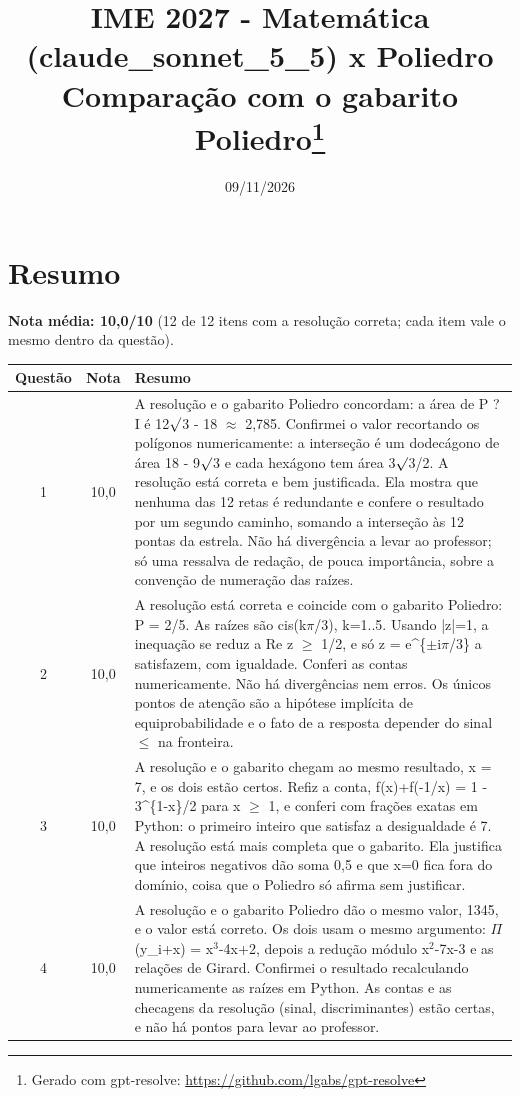 \documentclass{article}%
\title{IME 2027 {-} Matemática (claude\_sonnet\_5\_5) x Poliedro\\[4pt]\large Comparação com o gabarito Poliedro\thanks{Gerado com gpt-resolve: \url{https://github.com/lgabs/gpt-resolve}}}%
\date{09/11/2026}%
\begin{document}
%
\normalsize%
\maketitle%
\section*{Resumo}\textbf{Nota média: 10,0/10} (12 de 12 itens com a resolução correta; cada item vale o mesmo dentro da questão).\par\medskip%
\begin{longtable}{@{}c c p{}@{}}\toprule Questão & Nota & Resumo \\ \midrule
1 & 10,0 & A resolução e o gabarito Poliedro concordam: a área de P ? I é 12$\surd$3 - 18 $\approx$ 2,785. Confirmei o valor recortando os polígonos numericamente: a interseção é um dodecágono de área 18 - 9$\surd$3 e cada hexágono tem área 3$\surd$3/2. A resolução está correta e bem justificada. Ela mostra que nenhuma das 12 retas é redundante e confere o resultado por um segundo caminho, somando a interseção às 12 pontas da estrela. Não há divergência a levar ao professor; só uma ressalva de redação, de pouca importância, sobre a convenção de numeração das raízes. \\
2 & 10,0 & A resolução está correta e coincide com o gabarito Poliedro: P = 2/5. As raízes são cis(k$\pi$/3), k=1..5. Usando |z|=1, a inequação se reduz a Re z $\geq$ 1/2, e só z = e\^{}\{$\pm$i$\pi$/3\} a satisfazem, com igualdade. Conferi as contas numericamente. Não há divergências nem erros. Os únicos pontos de atenção são a hipótese implícita de equiprobabilidade e o fato de a resposta depender do sinal $\leq$ na fronteira. \\
3 & 10,0 & A resolução e o gabarito chegam ao mesmo resultado, x = 7, e os dois estão certos. Refiz a conta, f(x)+f(-1/x) = 1 - 3\^{}\{1-x\}/2 para x $\geq$ 1, e conferi com frações exatas em Python: o primeiro inteiro que satisfaz a desigualdade é 7. A resolução está mais completa que o gabarito. Ela justifica que inteiros negativos dão soma 0,5 e que x=0 fica fora do domínio, coisa que o Poliedro só afirma sem justificar. \\
4 & 10,0 & A resolução e o gabarito Poliedro dão o mesmo valor, 1345, e o valor está correto. Os dois usam o mesmo argumento: $\Pi$(y\_i+x) = x$^3${-}4x+2, depois a redução módulo x$^2${-}7x{-}3 e as relações de Girard. Confirmei o resultado recalculando numericamente as raízes em Python. As contas e as checagens da resolução (sinal, discriminantes) estão certas, e não há pontos para levar ao professor. \\

\end{longtable}
\end{document}
